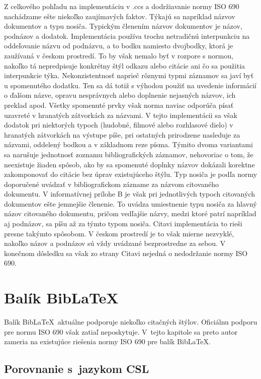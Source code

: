 \documentclass{fithesis3}
\begin{document}
	Z celkového pohľadu na implementáciu v .ccs a dodržiavanie normy ISO 690 nachádzame ešte niekoľko zaujímavých faktov. Týkajú sa napríklad názvov dokumentov a typu nosiča. Typickým členením názvov dokumentov je názov, podnázov a dodatok. Implementácia používa trochu netradičnú interpunkciu na oddeľovanie názvu od podnázvu, a to bodku namiesto dvojbodky, ktorá je zaužívaná v českom prostredí. To by však nemalo byť v rozpore s normou, nakoľko tá nepredpisuje konkrétny štýl odkazu alebo citácie ani čo sa použitia interpunkcie týka. Nekonzistentnosť naprieč rôznymi typmi záznamov sa javí byť u spomenutého dodatku. Ten sa dá totiž s výhodou použiť na uvedenie informácií o ďalšom názve, opravu nesprávnych  alebo doplnenie nejasných názvov, ich preklad apod. Všetky spomenuté prvky však norma naviac odporúča písať uzavreté v hranatých zátvorkách za názvami. V tejto implementácii sa však dodatok pri niektorých typoch (hudobné, filmové alebo rozhlasové dielo) v hranatých zátvorkách na výstupe píše, pri ostatných prirodzene nasleduje za názvami, oddelený bodkou a v základnom reze písma. Týmito dvoma variantami sa narušuje jednotnosť zoznamu bibliografických záznamov, nehovoriac o tom, že neexistuje žiaden spôsob, ako by sa spomenuté doplnky názvov dokázali korektne zakomponovať do citácie bez úprav existujúceho štýlu.
	Typ nosiča je podľa normy doporučené uvádzať v bibliografickom zázname za názvom citovaného dokumentu. V informatívnej prílohe B je však pri jednotlivých typoch citovaných dokumentov ešte jemnejšie členenie. To uvádza umiestnenie typu nosiča za hlavný názov citovaného dokumentu, pričom vedľajšie názvy, medzi ktoré patrí napríklad aj podnázov, sa píšu až za týmto typom nosiča. Citavi implementácia to rieši presne takýmto spôsobom. V českom prostredí je to však mierne nezvyklé, nakoľko názov a podnázov sú vždy uvádzané bezprostredne za sebou. V konečnom dôsledku sa však zo strany Citavi nejedná o nedodržanie normy ISO 690.
	
\chapter{Balík Bib\LaTeX}
Balík Bib\LaTeX\, aktuálne podporuje niekoľko citačných štýlov. Oficiálnu podporu pre normu ISO 690 však zatiaľ neposkytuje. V~tejto kapitole sa preto autor zameria na existujúce riešenia normy ISO 690 pre balík Bib\LaTeX.

	\section{Porovnanie s~jazykom CSL}
\end{document}
